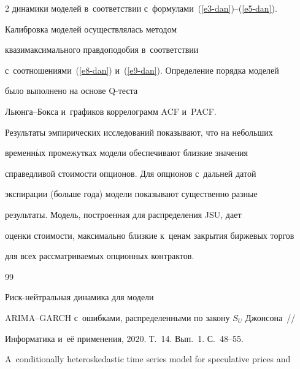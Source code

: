 \begin{multicols}{2}
динамики моделей в~соответствии с~формулами~(\ref{e3-dan})--(\ref{e5-dan}). 


Калибровка моделей осуществлялась методом 


квазимаксимального правдоподобия в~соответствии 


с~соотношениями~(\ref{e8-dan}) и~(\ref{e9-dan}). Определение порядка моделей 


было выполнено на основе Q-тес\-та  


Льюн\-га--Бок\-са и~графиков коррелограмм ACF и~PACF. 


  


  Результаты эмпирических исследований показывают, что на небольших 


временн$\acute{\mbox{ы}}$х промежутках модели обеспечивают близкие значения 


справедливой стоимости опционов. Для опционов с~дальней датой 


экспирации (больше года) модели показывают существенно разные 


результаты. Модель, построенная для распределения JSU, дает 


оценки стоимости, максимально близкие к~ценам закрытия биржевых торгов 


для всех рас\-смат\-ри\-ва\-емых опционных контрактов. 


  


{\small\frenchspacing


 {%




 \begin{thebibliography}{99}


  




 Риск-нейт\-раль\-ная динамика для модели 


ARIMA--GARCH с~ошиб\-ка\-ми, распределенными по закону $S_U$ Джонсона~// 


Информатика и~её применения, 2020. Т.~14. Вып.~1. С.~48--55.







 A~conditionally heteroskedastic time series model for speculative prices and 



\end{thebibliography}}}
\end{multicols}
